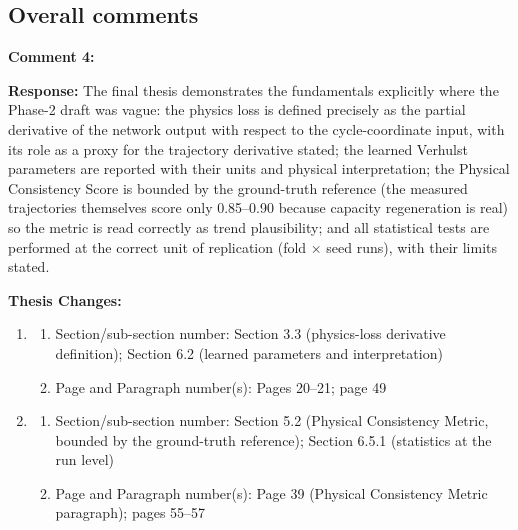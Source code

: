 \documentclass[12pt,a4paper]{article}
\begin{document}
\vspace{\baselineskip}

\subsection*{Overall comments}

\textbf{Comment 4:} 

\vspace{\baselineskip}

\textbf{Response:} The final thesis demonstrates the fundamentals explicitly
where the Phase-2 draft was vague: the physics loss is defined precisely as the
partial derivative of the network output with respect to the cycle-coordinate
input, with its role as a proxy for the trajectory derivative stated; the
learned Verhulst parameters are reported with their units and physical
interpretation; the Physical Consistency Score is bounded by the ground-truth
reference (the measured trajectories themselves score only 0.85--0.90 because
capacity regeneration is real) so the metric is read correctly as trend
plausibility; and all statistical tests are performed at the correct unit of
replication (fold $\times$ seed runs), with their limits stated.

\vspace{\baselineskip}

\textbf{Thesis Changes:}

\begin{enumerate}
    \item
    \begin{enumerate}
        \item Section/sub-section number: Section 3.3 (physics-loss derivative definition); Section 6.2 (learned parameters and interpretation)
        \item Page and Paragraph number(s): Pages 20--21; page 49
    \end{enumerate}
    \item
    \begin{enumerate}
        \item Section/sub-section number: Section 5.2 (Physical Consistency Metric, bounded by the ground-truth reference); Section 6.5.1 (statistics at the run level)
        \item Page and Paragraph number(s): Page 39 (Physical Consistency Metric paragraph); pages 55--57
    \end{enumerate}
\end{enumerate}
\end{document}
